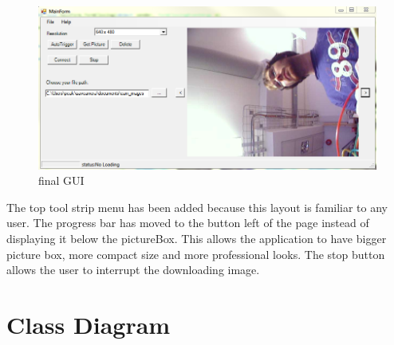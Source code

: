 \begin{figure}[H]
\begin{center}
\includegraphics[width=1.0\textwidth]{figures/finalGUI.png} 
\end{center}
\caption{final GUI\label{finalGUI}}
\end{figure}
The top tool strip menu has been added because this layout is familiar to any user. 
The progress bar has moved to the button left of the page instead of displaying it below the pictureBox.
This allows the application to have bigger picture box, more compact size and more professional looks.
The stop button allows the user to interrupt the downloading image.

\section{Class Diagram}
